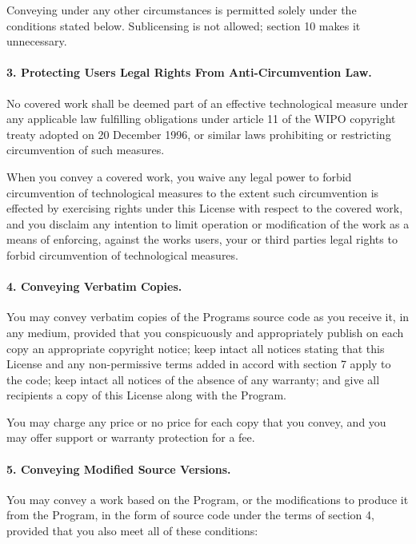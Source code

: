 Conveying under any other circumstances is permitted solely under the conditions stated below. Sublicensing is not allowed; section 10 makes it unnecessary.

\paragraph*{3. Protecting Users\textquotesingle{} Legal Rights From Anti-\/\+Circumvention Law.}

No covered work shall be deemed part of an effective technological measure under any applicable law fulfilling obligations under article 11 of the W\+I\+PO copyright treaty adopted on 20 December 1996, or similar laws prohibiting or restricting circumvention of such measures.

When you convey a covered work, you waive any legal power to forbid circumvention of technological measures to the extent such circumvention is effected by exercising rights under this License with respect to the covered work, and you disclaim any intention to limit operation or modification of the work as a means of enforcing, against the work\textquotesingle{}s users, your or third parties\textquotesingle{} legal rights to forbid circumvention of technological measures.

\paragraph*{4. Conveying Verbatim Copies.}

You may convey verbatim copies of the Program\textquotesingle{}s source code as you receive it, in any medium, provided that you conspicuously and appropriately publish on each copy an appropriate copyright notice; keep intact all notices stating that this License and any non-\/permissive terms added in accord with section 7 apply to the code; keep intact all notices of the absence of any warranty; and give all recipients a copy of this License along with the Program.

You may charge any price or no price for each copy that you convey, and you may offer support or warranty protection for a fee.

\paragraph*{5. Conveying Modified Source Versions.}

You may convey a work based on the Program, or the modifications to produce it from the Program, in the form of source code under the terms of section 4, provided that you also meet all of these conditions\+:


